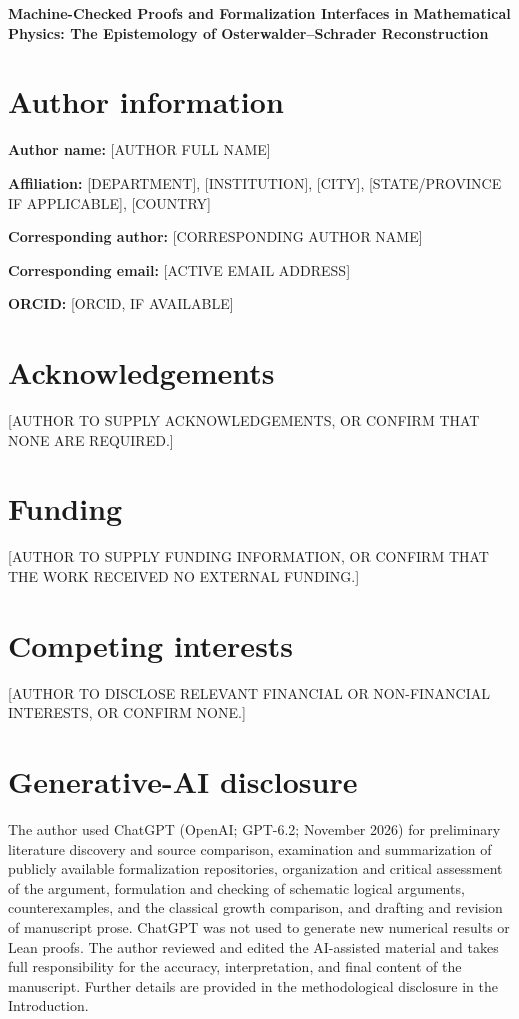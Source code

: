 \documentclass[12pt,a4paper]{article}
\begin{document}
\begin{center}
{\Large\bfseries Machine-Checked Proofs and Formalization Interfaces in Mathematical Physics: The Epistemology of Osterwalder--Schrader Reconstruction}
\end{center}

\section*{Author information}
\textbf{Author name:} [AUTHOR FULL NAME]

\textbf{Affiliation:} [DEPARTMENT], [INSTITUTION], [CITY], [STATE/PROVINCE IF APPLICABLE], [COUNTRY]

\textbf{Corresponding author:} [CORRESPONDING AUTHOR NAME]

\textbf{Corresponding email:} [ACTIVE EMAIL ADDRESS]

\textbf{ORCID:} [ORCID, IF AVAILABLE]

\section*{Acknowledgements}
[AUTHOR TO SUPPLY ACKNOWLEDGEMENTS, OR CONFIRM THAT NONE ARE REQUIRED.]

\section*{Funding}
[AUTHOR TO SUPPLY FUNDING INFORMATION, OR CONFIRM THAT THE WORK RECEIVED NO EXTERNAL FUNDING.]

\section*{Competing interests}
[AUTHOR TO DISCLOSE RELEVANT FINANCIAL OR NON-FINANCIAL INTERESTS, OR CONFIRM NONE.]

\section*{Generative-AI disclosure}
The author used ChatGPT (OpenAI; GPT-6.2; November 2026) for preliminary literature discovery and source comparison, examination and summarization of publicly available formalization repositories, organization and critical assessment of the argument, formulation and checking of schematic logical arguments, counterexamples, and the classical growth comparison, and drafting and revision of manuscript prose. ChatGPT was not used to generate new numerical results or Lean proofs. The author reviewed and edited the AI-assisted material and takes full responsibility for the accuracy, interpretation, and final content of the manuscript. Further details are provided in the methodological disclosure in the Introduction.
\end{document}
